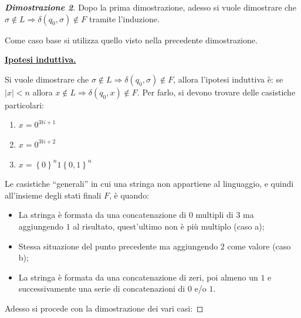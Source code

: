 \documentclass[a4paper]{article}
\newcommand{\dquotes}[1]{``#1''}
\begin{document}
	\newpage
	
	\begin{proof}[\textcolor{Blue3}{\textbf{Dimostrazione 2}}]
		Dopo la prima dimostrazione, adesso si vuole dimostrare che $\sigma \notin L \Longrightarrow \delta\left(q_{0}, \sigma\right) \notin F$ tramite l'induzione.\newline
		
		\noindent
		Come caso base si utilizza quello visto nella precedente dimostrazione.\newline
		
		\noindent
		\textbf{\underline{Ipotesi induttiva.}}\newline
		
		\noindent
		Si vuole dimostrare che $\sigma \notin L \Longrightarrow \delta\left(q_{0}, \sigma\right) \notin F$, allora l'ipotesi induttiva è: se $|x| < n$ allora $x \notin L \Longrightarrow \delta\left(q_{0}, x\right) \notin F$. Per farlo, si devono trovare delle casistiche particolari:
		
		\begin{enumerate}[label=\alph*.]
			\item $x = 0^{3\mathbb{N} + 1}$
			
			\item $x = 0^{3\mathbb{N} + 2}$
			
			\item $x = \left\{0\right\}^{n} 1 \left\{0, 1\right\}^{n}$
		\end{enumerate}
		
		\noindent
		Le casistiche \dquotes{generali} in cui una stringa non appartiene al linguaggio, e quindi all'insieme degli stati finali $F$, è quando:
		
		\begin{itemize}
			\item La stringa è formata da una concatenazione di $0$ multipli di $3$ ma aggiungendo $1$ al risultato, quest'ultimo non è più multiplo (caso a);
			
			\item Stessa situazione del punto precedente ma aggiungendo $2$ come valore (caso b);
			
			\item La stringa è formata da una concatenazione di zeri, poi almeno un $1$ e successivamente una serie di concatenazioni di $0$ e/o $1$.
		\end{itemize}
		
		\noindent
		Adesso si procede con la dimostrazione dei vari casi:
		

\end{proof}
\end{document}
